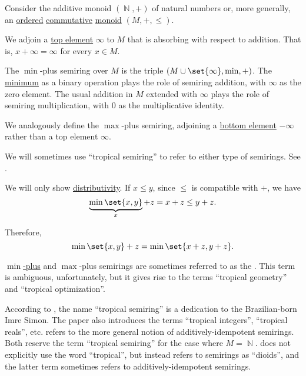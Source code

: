 \begin{definition}\label{def:tropical_semiring}
  Consider the additive monoid \( (\BbbN, +) \) of natural numbers or, more generally, an \hyperref[def:ordered_magma]{ordered} \hyperref[def:magma/commutative]{commutative} \hyperref[def:monoid]{monoid} \( (M, +, \leq) \).

  We adjoin a \hyperref[def:partially_ordered_set_extremal_points/top_and_bottom]{top element} \( \infty \) to \( M \) that is absorbing with respect to addition. That is, \( x + \infty = \infty \) for every \( x \in M \).

  The \( \min \)-plus semiring over \( M \) is the triple \( (M \cup \set{ \infty }, \min, +) \). The \hyperref[def:partially_ordered_set_extremal_points/maximum_and_minimum]{minimum} as a binary operation plays the role of semiring addition, with \( \infty \) as the zero element. The usual addition in \( M \) extended with \( \infty \) plays the role of semiring multiplication, with \( 0 \) as the multiplicative identity.

  We analogously define the \( \max \)-plus semiring, adjoining a \hyperref[def:partially_ordered_set_extremal_points/top_and_bottom]{bottom element} \( -\infty \) rather than a top element \( \infty \).

  We will sometimes use \enquote{tropical semiring} to refer to either type of semirings. See .
\end{definition}
\begin{defproof}
  We will only show \hyperref[def:semiring/left_distributivity]{distributivity}. If \( x \leq y \), since \( \leq \) is compatible with \( + \), we have
  \begin{equation*}
    \underbrace{\min\set{ x, y }}_{x} + z = x + z \leq y + z.
  \end{equation*}

  Therefore,
  \begin{equation*}
    \min\set{ x, y } + z = \min\set{ x + z , y + z }.
  \end{equation*}
\end{defproof}

\begin{remark}\label{rem:tropical_semiring_etymology}
  \hyperref[def:tropical_semiring]{\( \min \)-plus} and \( \max \)-plus semirings are sometimes referred to as the . This term is ambiguous, unfortunately, but it gives rise to the terms \enquote{tropical geometry} and \enquote{tropical optimization}.

  According to \cite{Pin1994}, the name \enquote{tropical semiring} is a dedication to the Brazilian-born Imre Simon. The paper also introduces the terms \enquote{tropical integers}, \enquote{tropical reals}, etc. \cite[3]{Golan2010} refers to the more general notion of additively-idempotent semirings. Both reserve the term \enquote{tropical semiring} for the case where \( M = \BbbN \). \cite[ch. 3]{GondranMinoux1984Graphs} does not explicitly use the word \enquote{tropical}, but instead refers to semirings as \enquote{dioids}, and the latter term sometimes refers to additively-idempotent semirings.
\end{remark}

